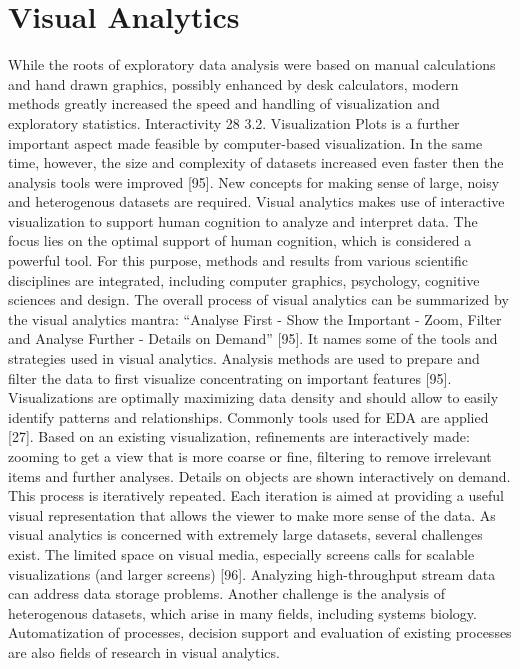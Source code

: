 \section{Visual Analytics}
While the roots of exploratory data analysis were based on manual calculations and
hand drawn graphics, possibly enhanced by desk calculators, modern methods greatly
increased the speed and handling of visualization and exploratory statistics. Interactivity
28
3.2. Visualization Plots
is a further important aspect made feasible by computer-based visualization. In the same
time, however, the size and complexity of datasets increased even faster then the analysis
tools were improved [95]. New concepts for making sense of large, noisy and heterogenous
datasets are required. Visual analytics makes use of interactive visualization to support
human cognition to analyze and interpret data. The focus lies on the optimal support
of human cognition, which is considered a powerful tool. For this purpose, methods and
results from various scientific disciplines are integrated, including computer graphics,
psychology, cognitive sciences and design.
The overall process of visual analytics can be summarized by the visual analytics
mantra: “Analyse First - Show the Important - Zoom, Filter and Analyse Further - Details on Demand” [95]. It names some of the tools and strategies used in visual analytics.
Analysis methods are used to prepare and filter the data to first visualize concentrating on important features [95]. Visualizations are optimally maximizing data density and
should allow to easily identify patterns and relationships. Commonly tools used for EDA
are applied [27]. Based on an existing visualization, refinements are interactively made:
zooming to get a view that is more coarse or fine, filtering to remove irrelevant items and
further analyses. Details on objects are shown interactively on demand. This process is
iteratively repeated. Each iteration is aimed at providing a useful visual representation
that allows the viewer to make more sense of the data.
As visual analytics is concerned with extremely large datasets, several challenges exist.
The limited space on visual media, especially screens calls for scalable visualizations (and
larger screens) [96]. Analyzing high-throughput stream data can address data storage
problems. Another challenge is the analysis of heterogenous datasets, which arise in
many fields, including systems biology. Automatization of processes, decision support
and evaluation of existing processes are also fields of research in visual analytics.

